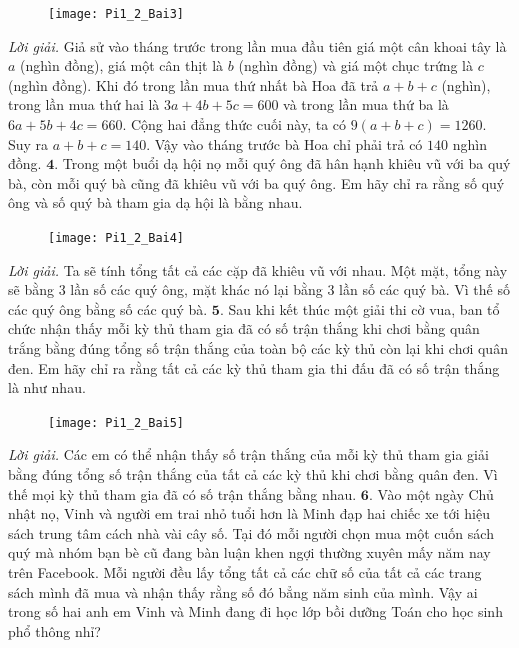 \begin{multicols}{2}
	\begin{figure}[H]
		\centering
		\vspace*{-10pt}
		\captionsetup{labelformat= empty, justification=centering}
		\texttt{[image: Pi1\_2\_Bai3]}
		\vspace*{-10pt}
	\end{figure}
	\textit{Lời giải.} 	Giả sử vào tháng trước trong lần mua đầu tiên giá một cân khoai tây là $a$ (nghìn đồng), giá một cân thịt là $b$ (nghìn đồng) và giá một chục trứng là $c$ (nghìn đồng). Khi đó trong lần mua thứ nhất bà Hoa đã trả $a + b + c$ (nghìn), trong lần mua thứ hai là $3a+4b+5c = 600$ và trong lần mua thứ ba là $6a + 5b+ 4c = 660$. Cộng hai đẳng thức cuối này, ta có $9(a+b+c)= 1260$. Suy ra $a+b+c = 140$. Vậy vào tháng trước bà Hoa chỉ phải trả có $140$ nghìn đồng.
	\vskip 0.1cm
	$\pmb{4.}$ Trong một buổi dạ hội nọ mỗi quý ông đã hân hạnh khiêu vũ với ba quý bà, còn mỗi quý bà cũng đã khiêu vũ với ba quý ông. Em hãy chỉ ra rằng số quý ông và số quý bà tham gia dạ hội là bằng nhau.
	\begin{figure}[H]
		\centering
		\vspace*{-5pt}
		\captionsetup{labelformat= empty, justification=centering}
		\texttt{[image: Pi1\_2\_Bai4]}
		\vspace*{-10pt}
	\end{figure}
	\textit{Lời giải.} Ta sẽ tính tổng tất cả các cặp đã khiêu vũ với nhau. Một mặt, tổng này sẽ bằng $3$ lần số các quý ông, mặt khác nó lại bằng $3$ lần số các quý bà. Vì thế số các quý ông bằng số các quý bà.
	\vskip 0.1cm
	$\pmb{5.}$ 	Sau khi kết thúc một giải thi cờ vua, ban tổ chức nhận thấy mỗi kỳ thủ tham gia đã có số trận thắng khi chơi bằng quân trắng bằng đúng tổng số trận thắng của toàn bộ các kỳ thủ còn lại khi chơi quân đen. Em hãy chỉ ra rằng tất cả các kỳ thủ tham gia thi đấu đã có số trận thắng là như nhau.
	\begin{figure}[H]
		\centering
		\vspace*{-5pt}
		\captionsetup{labelformat= empty, justification=centering}
		\texttt{[image: Pi1\_2\_Bai5]}
		\vspace*{-10pt}
	\end{figure}
	\textit{Lời giải.} Các em có thể nhận thấy số trận thắng của mỗi kỳ thủ tham gia giải bằng đúng tổng số trận thắng của tất cả các kỳ thủ khi chơi bằng quân đen. Vì thế mọi kỳ thủ tham gia đã có số trận thắng bằng nhau.
	\vskip 0.1cm
	$\pmb{6.}$ Vào một ngày Chủ nhật nọ, Vinh và người em trai nhỏ tuổi hơn là Minh  đạp hai chiếc xe tới hiệu sách trung tâm cách nhà vài cây số. Tại đó mỗi người chọn mua một cuốn sách quý mà nhóm bạn bè cũ đang bàn luận khen ngợi thường xuyên mấy năm nay trên Facebook. Mỗi người đều lấy tổng tất cả các chữ số của tất cả các trang sách mình đã mua và nhận thấy rằng số đó bẳng năm sinh của mình. Vậy ai  trong số hai anh em Vinh và Minh  đang đi học lớp  bồi dưỡng Toán cho học sinh phổ thông nhỉ?

\end{multicols}
